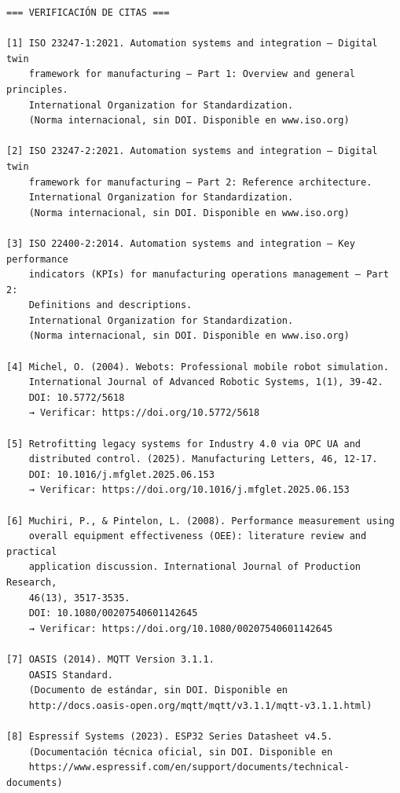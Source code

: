 \begin{verbatim}
=== VERIFICACIÓN DE CITAS ===

[1] ISO 23247-1:2021. Automation systems and integration — Digital twin 
    framework for manufacturing — Part 1: Overview and general principles.
    International Organization for Standardization.
    (Norma internacional, sin DOI. Disponible en www.iso.org)

[2] ISO 23247-2:2021. Automation systems and integration — Digital twin
    framework for manufacturing — Part 2: Reference architecture.
    International Organization for Standardization.
    (Norma internacional, sin DOI. Disponible en www.iso.org)

[3] ISO 22400-2:2014. Automation systems and integration — Key performance
    indicators (KPIs) for manufacturing operations management — Part 2:
    Definitions and descriptions.
    International Organization for Standardization.
    (Norma internacional, sin DOI. Disponible en www.iso.org)

[4] Michel, O. (2004). Webots: Professional mobile robot simulation.
    International Journal of Advanced Robotic Systems, 1(1), 39-42.
    DOI: 10.5772/5618
    → Verificar: https://doi.org/10.5772/5618

[5] Retrofitting legacy systems for Industry 4.0 via OPC UA and 
    distributed control. (2025). Manufacturing Letters, 46, 12-17.
    DOI: 10.1016/j.mfglet.2025.06.153
    → Verificar: https://doi.org/10.1016/j.mfglet.2025.06.153

[6] Muchiri, P., & Pintelon, L. (2008). Performance measurement using
    overall equipment effectiveness (OEE): literature review and practical
    application discussion. International Journal of Production Research,
    46(13), 3517-3535.
    DOI: 10.1080/00207540601142645
    → Verificar: https://doi.org/10.1080/00207540601142645

[7] OASIS (2014). MQTT Version 3.1.1.
    OASIS Standard.
    (Documento de estándar, sin DOI. Disponible en
    http://docs.oasis-open.org/mqtt/mqtt/v3.1.1/mqtt-v3.1.1.html)

[8] Espressif Systems (2023). ESP32 Series Datasheet v4.5.
    (Documentación técnica oficial, sin DOI. Disponible en
    https://www.espressif.com/en/support/documents/technical-documents)

\end{verbatim}